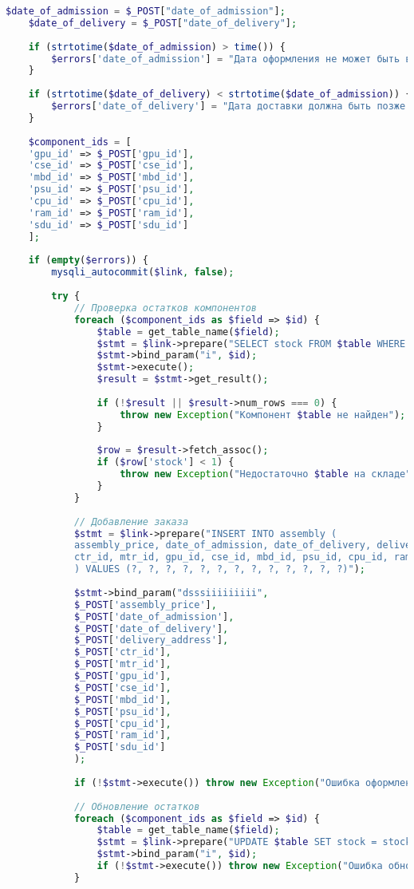 \begin{lstlisting}[language=Php, frame=none]
	$date_of_admission = $_POST["date_of_admission"];
	$date_of_delivery = $_POST["date_of_delivery"];
	
	if (strtotime($date_of_admission) > time()) {
		$errors['date_of_admission'] = "Дата оформления не может быть в будущем.";
	}
	
	if (strtotime($date_of_delivery) < strtotime($date_of_admission)) {
		$errors['date_of_delivery'] = "Дата доставки должна быть позже даты оформления.";
	}
	
	$component_ids = [
	'gpu_id' => $_POST['gpu_id'],
	'cse_id' => $_POST['cse_id'],
	'mbd_id' => $_POST['mbd_id'],
	'psu_id' => $_POST['psu_id'],
	'cpu_id' => $_POST['cpu_id'],
	'ram_id' => $_POST['ram_id'],
	'sdu_id' => $_POST['sdu_id']
	];
	
	if (empty($errors)) {
		mysqli_autocommit($link, false);
		
		try {
			// Проверка остатков компонентов
			foreach ($component_ids as $field => $id) {
				$table = get_table_name($field);
				$stmt = $link->prepare("SELECT stock FROM $table WHERE ".get_id_column($table)." = ? FOR UPDATE");
				$stmt->bind_param("i", $id);
				$stmt->execute();
				$result = $stmt->get_result();
				
				if (!$result || $result->num_rows === 0) {
					throw new Exception("Компонент $table не найден");
				}
				
				$row = $result->fetch_assoc();
				if ($row['stock'] < 1) {
					throw new Exception("Недостаточно $table на складе");
				}
			}
			
			// Добавление заказа
			$stmt = $link->prepare("INSERT INTO assembly (
			assembly_price, date_of_admission, date_of_delivery, delivery_address,
			ctr_id, mtr_id, gpu_id, cse_id, mbd_id, psu_id, cpu_id, ram_id, sdu_id
			) VALUES (?, ?, ?, ?, ?, ?, ?, ?, ?, ?, ?, ?, ?)");
			
			$stmt->bind_param("dsssiiiiiiiii",
			$_POST['assembly_price'],
			$_POST['date_of_admission'],
			$_POST['date_of_delivery'],
			$_POST['delivery_address'],
			$_POST['ctr_id'],
			$_POST['mtr_id'],
			$_POST['gpu_id'],
			$_POST['cse_id'],
			$_POST['mbd_id'],
			$_POST['psu_id'],
			$_POST['cpu_id'],
			$_POST['ram_id'],
			$_POST['sdu_id']
			);
			
			if (!$stmt->execute()) throw new Exception("Ошибка оформления: ".$stmt->error);
			
			// Обновление остатков
			foreach ($component_ids as $field => $id) {
				$table = get_table_name($field);
				$stmt = $link->prepare("UPDATE $table SET stock = stock - 1 WHERE ".get_id_column($table)." = ?");
				$stmt->bind_param("i", $id);
				if (!$stmt->execute()) throw new Exception("Ошибка обновления: ".$stmt->error);
			}
			

\end{lstlisting}
